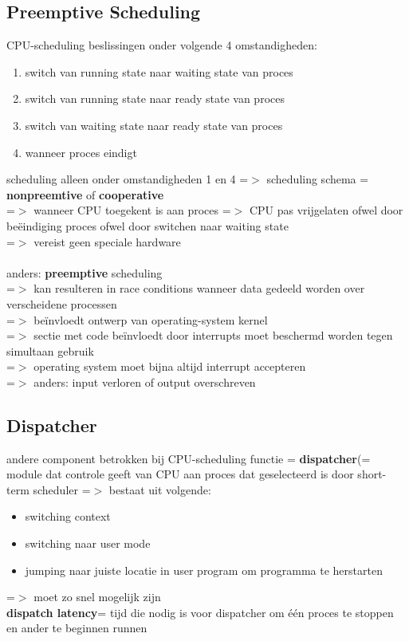 \documentclass{report}
\begin{document}
\subsection{Preemptive Scheduling}
CPU-scheduling beslissingen onder volgende 4 omstandigheden:

\begin{enumerate}
\item switch van running state naar waiting state van proces
\item switch van running state naar ready state van proces
\item switch van waiting state naar ready state van proces
\item wanneer proces eindigt
\end{enumerate}

scheduling alleen onder omstandigheden 1 en 4 =$>$ scheduling schema = \textbf{nonpreemtive} of \textbf{cooperative}
\\=$>$ wanneer CPU toegekent is aan proces =$>$ CPU pas vrijgelaten ofwel door be\"eindiging proces ofwel door switchen naar waiting state
\\=$>$ vereist geen speciale hardware
\\
\\anders: \textbf{preemptive} scheduling
\\=$>$ kan resulteren in race conditions wanneer data gedeeld worden over verscheidene processen
\\=$>$ be\"invloedt ontwerp van operating-system kernel
\\=$>$ sectie met code be\"invloedt door interrupts moet beschermd worden tegen simultaan gebruik
\\=$>$ operating system moet bijna altijd interrupt accepteren
\\=$>$ anders: input verloren of output overschreven

\subsection{Dispatcher}
andere component betrokken bij CPU-scheduling functie = \textbf{dispatcher}(= module dat controle geeft van CPU aan proces dat geselecteerd is door short-term scheduler
=$>$ bestaat uit volgende:
\begin{itemize}
\item switching context
\item switching naar user mode
\item jumping naar juiste locatie in user program om programma te herstarten
\end{itemize}
=$>$ moet zo snel mogelijk zijn
\\\textbf{dispatch latency}= tijd die nodig is voor dispatcher om \'e\'en proces te stoppen en ander te beginnen runnen
\end{document}

